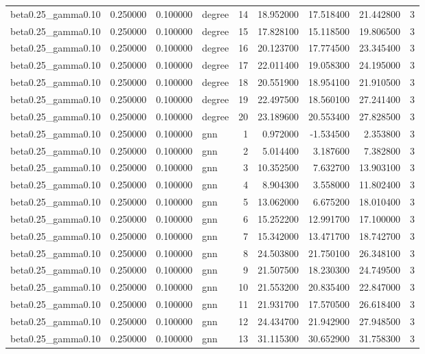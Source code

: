 \begin{tabular}{lrrlrrrrr}
beta0.25\_gamma0.10 & 0.250000 & 0.100000 & degree & 14 & 18.952000 & 17.518400 & 21.442800 & 3 \\
beta0.25\_gamma0.10 & 0.250000 & 0.100000 & degree & 15 & 17.828100 & 15.118500 & 19.806500 & 3 \\
beta0.25\_gamma0.10 & 0.250000 & 0.100000 & degree & 16 & 20.123700 & 17.774500 & 23.345400 & 3 \\
beta0.25\_gamma0.10 & 0.250000 & 0.100000 & degree & 17 & 22.011400 & 19.058300 & 24.195000 & 3 \\
beta0.25\_gamma0.10 & 0.250000 & 0.100000 & degree & 18 & 20.551900 & 18.954100 & 21.910500 & 3 \\
beta0.25\_gamma0.10 & 0.250000 & 0.100000 & degree & 19 & 22.497500 & 18.560100 & 27.241400 & 3 \\
beta0.25\_gamma0.10 & 0.250000 & 0.100000 & degree & 20 & 23.189600 & 20.553400 & 27.828500 & 3 \\
beta0.25\_gamma0.10 & 0.250000 & 0.100000 & gnn & 1 & 0.972000 & -1.534500 & 2.353800 & 3 \\
beta0.25\_gamma0.10 & 0.250000 & 0.100000 & gnn & 2 & 5.014400 & 3.187600 & 7.382800 & 3 \\
beta0.25\_gamma0.10 & 0.250000 & 0.100000 & gnn & 3 & 10.352500 & 7.632700 & 13.903100 & 3 \\
beta0.25\_gamma0.10 & 0.250000 & 0.100000 & gnn & 4 & 8.904300 & 3.558000 & 11.802400 & 3 \\
beta0.25\_gamma0.10 & 0.250000 & 0.100000 & gnn & 5 & 13.062000 & 6.675200 & 18.010400 & 3 \\
beta0.25\_gamma0.10 & 0.250000 & 0.100000 & gnn & 6 & 15.252200 & 12.991700 & 17.100000 & 3 \\
beta0.25\_gamma0.10 & 0.250000 & 0.100000 & gnn & 7 & 15.342000 & 13.471700 & 18.742700 & 3 \\
beta0.25\_gamma0.10 & 0.250000 & 0.100000 & gnn & 8 & 24.503800 & 21.750100 & 26.348100 & 3 \\
beta0.25\_gamma0.10 & 0.250000 & 0.100000 & gnn & 9 & 21.507500 & 18.230300 & 24.749500 & 3 \\
beta0.25\_gamma0.10 & 0.250000 & 0.100000 & gnn & 10 & 21.553200 & 20.835400 & 22.847000 & 3 \\
beta0.25\_gamma0.10 & 0.250000 & 0.100000 & gnn & 11 & 21.931700 & 17.570500 & 26.618400 & 3 \\
beta0.25\_gamma0.10 & 0.250000 & 0.100000 & gnn & 12 & 24.434700 & 21.942900 & 27.948500 & 3 \\
beta0.25\_gamma0.10 & 0.250000 & 0.100000 & gnn & 13 & 31.115300 & 30.652900 & 31.758300 & 3 \\

\end{tabular}
